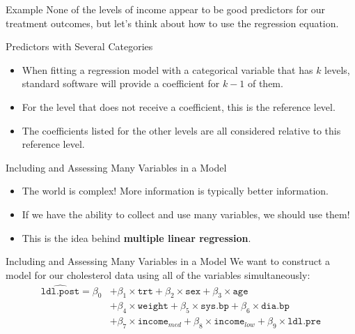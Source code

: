 \begin{frame}{Example}
    None of the levels of income appear to be good predictors for our treatment outcomes, but let's think about how to use the regression equation.
\end{frame}

\begin{frame}{Predictors with Several Categories}
    \begin{itemize}
        \item When fitting a regression model with a categorical variable that has $k$ levels, standard software will provide a coefficient for $k − 1$ of them.
        \item For the level that does not receive a coefficient, this is the reference level. 
        \item The coefficients listed for the other levels are all considered relative to this reference level.
    \end{itemize}
\end{frame}

\begin{frame}{Including and Assessing Many Variables in a Model}
    \begin{itemize}
        \item The world is complex! More information is typically better information.
        \item If we have the ability to collect and use many variables, we should use them!
        \item This is the idea behind \textbf{multiple linear regression}.
    \end{itemize}
\end{frame}

\begin{frame}{Including and Assessing Many Variables in a Model}
    We want to construct a model for our cholesterol data using all of the variables simultaneously:
    \begin{align*}
        \hat{\texttt{ldl.post}} = \beta_0 &+ \beta_1 \times \texttt{trt} + \beta_2 \times \texttt{sex} + \beta_3 \times \texttt{age} \\
        &+ \beta_4 \times \texttt{weight} + \beta_5 \times \texttt{sys.bp} + \beta_6 \times \texttt{dia.bp} \\
        &+ \beta_7 \times \texttt{income}_{med} + \beta_8 \times \texttt{income}_{low} + \beta_9 \times \texttt{ldl.pre} 
    \end{align*}
\end{frame}

